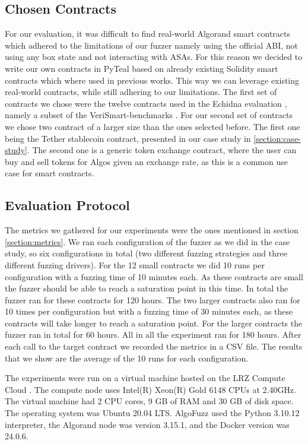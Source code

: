 \subsection*{Chosen Contracts}
For our evaluation, it was difficult to find real-world Algorand smart contracts which adhered to the limitations of our fuzzer namely using the official \ac{ABI}, not using any box state and not interacting with \acp{ASA}.
For this reason we decided to write our own contracts in PyTeal based on already existing Solidity smart contracts which where used in previous works.
This way we can leverage existing real-world contracts, while still adhering to our limitations.
The first set of contracts we chose were the twelve contracts used in the Echidna evaluation \cite{grieco_echidna_2020}, namely a subset of the VeriSmart-benchmarks \cite{noauthor_kuplverismart-benchmarks_nodate}.
For our second set of contracts we chose two contract of a larger size than the ones selected before.
The first one being the Tether stablecoin contract, presented in our case study in \ref{section:case-study}.
The second one is a generic token exchange contract, where the user can buy and sell tokens for Algos given an exchange rate, as this is a common use case for smart contracts.

\subsection*{Evaluation Protocol}
The metrics we gathered for our experiments were the ones mentioned in section \ref{section:metrics}.
We ran each configuration of the fuzzer as we did in the case study, so six configurations in total (two different fuzzing strategies and three different fuzzing drivers).
For the 12 small contracts we did 10 runs per configuration with a fuzzing time of 10 minutes each.
As these contracts are small the fuzzer should be able to reach a saturation point in this time.
In total the fuzzer ran for these contracts for 120 hours.
The two larger contracts also ran for 10 times per configuration but with a fuzzing time of 30 minutes each, as these contracts will take longer to reach a saturation point.
For the larger contracts the fuzzer ran in total for 60 hours.
All in all the experiment ran for 180 hours. After each call to the target contract we recorded the metrics in a \acs{CSV} file. The results that we show are the average of the 10 runs for each configuration.

The experiments were run on a virtual machine hosted on the LRZ Compute Cloud \cite{noauthor_lrz_nodate}.
The compute node uses Intel(R) Xeon(R) Gold 6148 CPUs at 2.40GHz.
The virtual machine had 2 CPU cores, 9 GB of RAM and 30 GB of disk space.
The operating system was Ubuntu 20.04 LTS.
AlgoFuzz used the Python 3.10.12 interpreter, the Algorand node was version 3.15.1, and the Docker version was 24.0.6.

